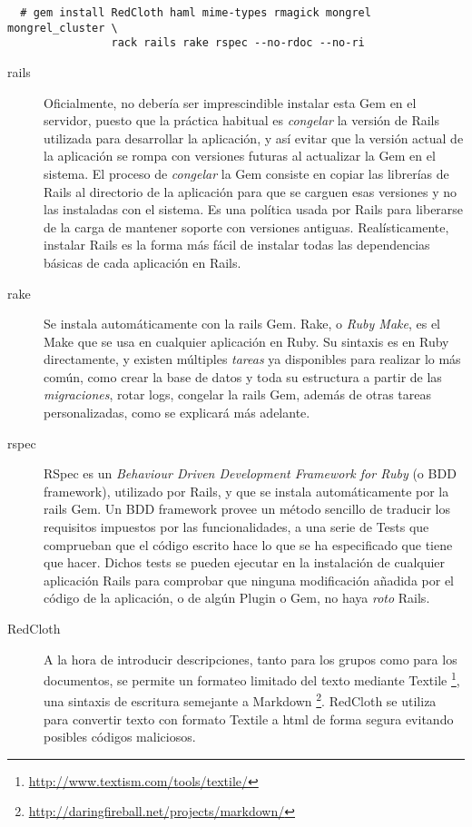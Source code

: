 \begin{verbatim}
  # gem install RedCloth haml mime-types rmagick mongrel mongrel_cluster \
                rack rails rake rspec --no-rdoc --no-ri
\end{verbatim}

\begin{description}
  \item[rails] Oficialmente, no debería ser imprescindible instalar esta Gem en el servidor, puesto que la práctica habitual es \emph{congelar} la versión de Rails utilizada para desarrollar la aplicación, y así evitar que la versión actual de la aplicación se rompa con versiones futuras al actualizar la Gem en el sistema. El proceso de \emph{congelar} la Gem consiste en copiar las librerías de Rails al directorio de la aplicación para que se carguen esas versiones y no las instaladas con el sistema. Es una política usada por Rails para liberarse de la carga de mantener soporte con versiones antiguas. Realísticamente, instalar Rails es la forma más fácil de instalar todas las dependencias básicas de cada aplicación en Rails.
  
  \item[rake] Se instala automáticamente con la rails Gem. Rake, o \emph{Ruby Make}, es el Make que se usa en cualquier aplicación en Ruby. Su sintaxis es en Ruby directamente, y existen múltiples \emph{tareas} ya disponibles para realizar lo más común, como crear la base de datos y toda su estructura a partir de las \emph{migraciones}, rotar logs, congelar la rails Gem, además de otras tareas personalizadas, como se explicará más adelante. 
  
  \item[rspec] RSpec es un \emph{Behaviour Driven Development Framework for Ruby} (o BDD framework), utilizado por Rails, y que se instala automáticamente por la rails Gem. Un BDD framework provee un método sencillo de traducir los requisitos impuestos por las funcionalidades, a una serie de Tests que comprueban que el código escrito hace lo que se ha especificado que tiene que hacer. Dichos tests se pueden ejecutar en la instalación de cualquier aplicación Rails para comprobar que ninguna modificación añadida por el código de la aplicación, o de algún Plugin o Gem, no haya \emph{roto} Rails.
  
  \item[RedCloth] A la hora de introducir descripciones, tanto para los grupos como para los documentos, se permite un formateo limitado del texto mediante Textile \footnote{\url{http://www.textism.com/tools/textile/}}, una sintaxis de escritura semejante a Markdown \footnote{\url{http://daringfireball.net/projects/markdown/}}. RedCloth se utiliza para convertir texto con formato Textile a html de forma segura evitando posibles códigos maliciosos.
  

\end{description}
